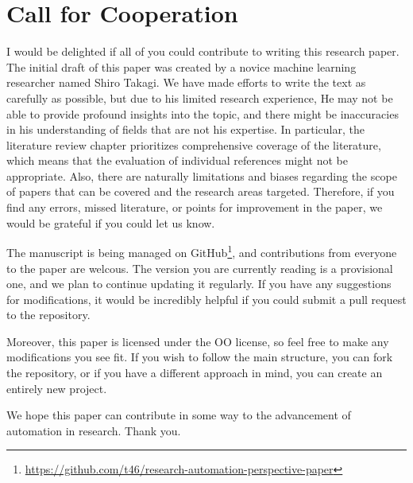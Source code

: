 \section{Call for Cooperation}
I would be delighted if all of you could contribute to writing this research paper. The initial draft of this paper was created by a novice machine learning researcher named Shiro Takagi. We have made efforts to write the text as carefully as possible, but due to his limited research experience, He may not be able to provide profound insights into the topic, and there might be inaccuracies in his understanding of fields that are not his expertise. In particular, the literature review chapter prioritizes comprehensive coverage of the literature, which means that the evaluation of individual references might not be appropriate. Also, there are naturally limitations and biases regarding the scope of papers that can be covered and the research areas targeted. Therefore, if you find any errors, missed literature, or points for improvement in the paper, we would be grateful if you could let us know.

The manuscript is being managed on GitHub\footnote{\url{https://github.com/t46/research-automation-perspective-paper}}, and contributions from everyone to the paper are welcous. The version you are currently reading is a provisional one, and we plan to continue updating it regularly. If you have any suggestions for modifications, it would be incredibly helpful if you could submit a pull request to the repository.

Moreover, this paper is licensed under the OO license, so feel free to make any modifications you see fit. If you wish to follow the main structure, you can fork the repository, or if you have a different approach in mind, you can create an entirely new project.

We hope this paper can contribute in some way to the advancement of automation in research. Thank you.





